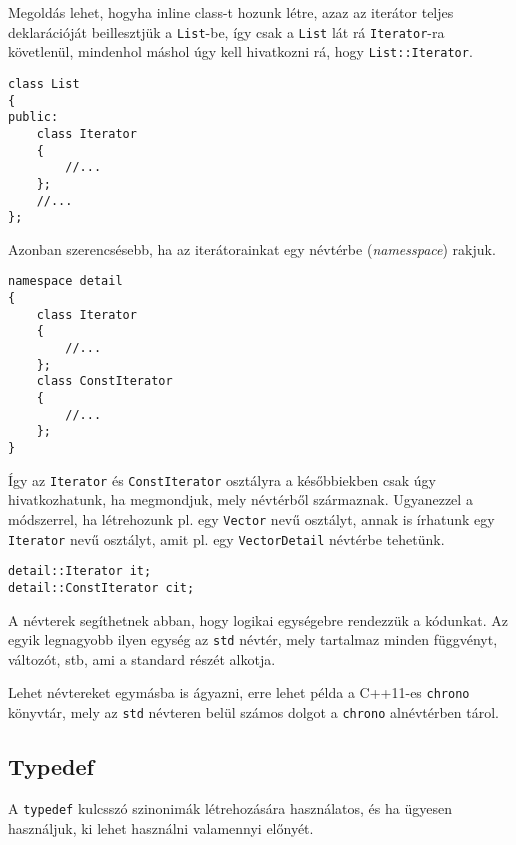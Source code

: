 \documentclass[a4paper,11.5pt,table]{article}
\begin{document}
	Megoldás lehet, hogyha inline class-t hozunk létre, azaz az iterátor teljes deklarációját beillesztjük a \texttt{List}-be, így csak a \texttt{List} lát rá \texttt{Iterator}-ra követlenül, mindenhol máshol úgy kell hivatkozni rá, hogy \texttt{List::Iterator}.
	\begin{lstlisting}
class List
{
public:
	class Iterator
	{
		//...
	};
	//...
};
	\end{lstlisting}
	
	Azonban szerencsésebb, ha az iterátorainkat egy névtérbe (\textit{namesspace}) rakjuk.
\begin{lstlisting}
namespace detail
{
	class Iterator
	{
		//...
	};
	class ConstIterator
	{
		//...
	};
}
\end{lstlisting}
	Így az \texttt{Iterator} és \texttt{ConstIterator} osztályra a későbbiekben csak úgy hivatkozhatunk, ha megmondjuk, mely névtérből származnak. Ugyanezzel a módszerrel, ha létrehozunk pl. egy \texttt{Vector} nevű osztályt, annak is írhatunk egy \texttt{Iterator} nevű osztályt, amit pl. egy \texttt{VectorDetail} névtérbe tehetünk.
	\begin{lstlisting}
detail::Iterator it;
detail::ConstIterator cit;
	\end{lstlisting}

	A névterek segíthetnek abban, hogy logikai egységebre rendezzük a kódunkat. Az egyik legnagyobb ilyen egység az \texttt{std} névtér, mely tartalmaz minden függvényt, változót, stb, ami a standard részét alkotja. 
	
	Lehet névtereket egymásba is ágyazni, erre lehet példa a C++11-es \texttt{chrono} könyvtár, mely az \texttt{std} névteren belül számos dolgot a \texttt{chrono} alnévtérben tárol.
	
	\subsection{Typedef}
	A \texttt{typedef} kulcsszó szinonimák létrehozására használatos, és ha ügyesen használjuk, ki lehet használni valamennyi előnyét. 
	
\end{document}
